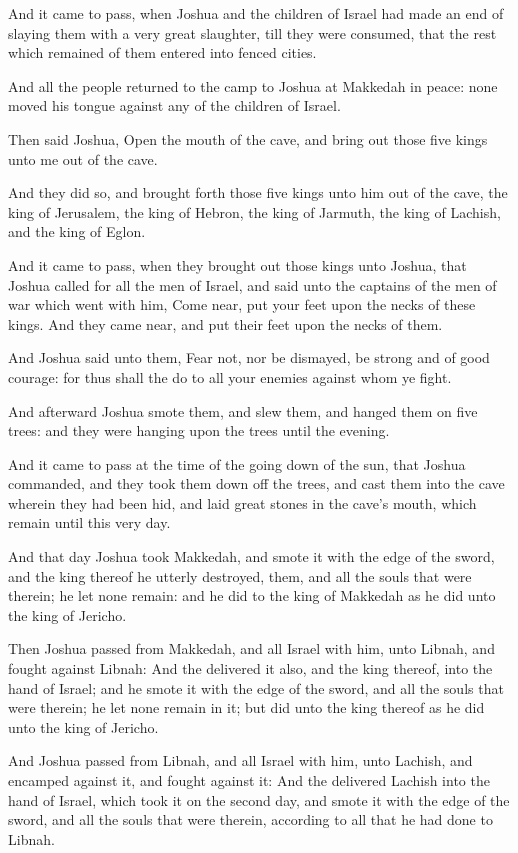 \Verse And it came to pass, when Joshua and the children of Israel had made an end of slaying them with a very great slaughter, till they were consumed, that the rest which remained of them entered into fenced cities.

\Verse And all the people returned to the camp to Joshua at Makkedah in peace: none moved his tongue against any of the children of Israel.

\Verse Then said Joshua, Open the mouth of the cave, and bring out those five kings unto me out of the cave.

\Verse And they did so, and brought forth those five kings unto him out of the cave, the king of Jerusalem, the king of Hebron, the king of Jarmuth, the king of Lachish, and the king of Eglon.

\Verse And it came to pass, when they brought out those kings unto Joshua, that Joshua called for all the men of Israel, and said unto the captains of the men of war which went with him, Come near, put your feet upon the necks of these kings. And they came near, and put their feet upon the necks of them.

\Verse And Joshua said unto them, Fear not, nor be dismayed, be strong and of good courage: for thus shall the \LORD do to all your enemies against whom ye fight.

\Verse And afterward Joshua smote them, and slew them, and hanged them on five trees: and they were hanging upon the trees until the evening.

\Verse And it came to pass at the time of the going down of the sun, that Joshua commanded, and they took them down off the trees, and cast them into the cave wherein they had been hid, and laid great stones in the cave's mouth, which remain until this very day.

\Verse And that day Joshua took Makkedah, and smote it with the edge of the sword, and the king thereof he utterly destroyed, them, and all the souls that were therein; he let none remain: and he did to the king of Makkedah as he did unto the king of Jericho.

\Verse Then Joshua passed from Makkedah, and all Israel with him, unto Libnah, and fought against Libnah: \Verse And the \LORD delivered it also, and the king thereof, into the hand of Israel; and he smote it with the edge of the sword, and all the souls that were therein; he let none remain in it; but did unto the king thereof as he did unto the king of Jericho.

\Verse And Joshua passed from Libnah, and all Israel with him, unto Lachish, and encamped against it, and fought against it: \Verse And the \LORD delivered Lachish into the hand of Israel, which took it on the second day, and smote it with the edge of the sword, and all the souls that were therein, according to all that he had done to Libnah.

